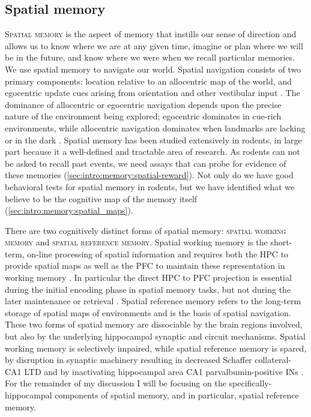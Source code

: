 \subsection{Spatial memory}
\label{sec:intro:memory:spatial}
\textsc{Spatial memory} is the aspect of memory that instills our sense of direction and allows us to know where we are at any given time, imagine or plan where we will be in the future, and know where we were when we recall particular memories.
We use spatial memory to navigate our world.
Spatial navigation consists of two primary components: location relative to an allocentric map of the world, and egocentric update cues arising from orientation and other vestibular input \citep{Sanders2015}.
The dominance of allocentric or egocentric navigation depends upon the precise nature of the environment being explored; egocentric dominates in cue-rich environments, while allocentric navigation dominates when landmarks are lacking or in the dark \citep{Knierim1998, Markus1994}.
Spatial memory has been studied extensively in rodents, in large part because it a well-defined and tractable area of research.
As rodents can not be asked to recall past events, we need assays that can probe for evidence of these memories (\autoref{sec:intro:memory:spatial-reward}).
Not only do we have good behavioral tests for spatial memory in rodents, but we have identified what we believe to be the cognitive map of the memory itself (\autoref{sec:intro:memory:spatial_maps}).

There are two cognitively distinct forms of spatial memory: \textsc{spatial working memory} and \textsc{spatial reference memory}.
Spatial working memory is the short-term, on-line processing of spatial information and requires both the \ac{HPC} to provide spatial maps \citep{Morris1982} as well as the \ac{PFC} to maintain these representation in working memory \citep{Olton1979}.
In particular the direct \ac{HPC} to \ac{PFC} projection is essential during the initial encoding phase in spatial memory tasks, but not during the later maintenance or retrieval \citep{Spellman2015}.
Spatial reference memory refers to the long-term storage of spatial maps of environments and is the basis of spatial navigation.
These two forms of spatial memory are dissociable by the brain regions involved, but also by the underlying hippocampal synaptic and circuit mechanisms.
Spatial working memory is selectively impaired, while spatial reference memory is spared, by disruption in synaptic machinery resulting in decreased Schaffer collateral-CA1 LTD \citep{Zeng2001} and by inactivating hippocampal area CA1 parvalbumin-positive \acp{IN} \citep{Murray2011}.
For the remainder of my discussion I will be focusing on the specifically-hippocampal components of spatial memory, and in particular, spatial reference memory.

